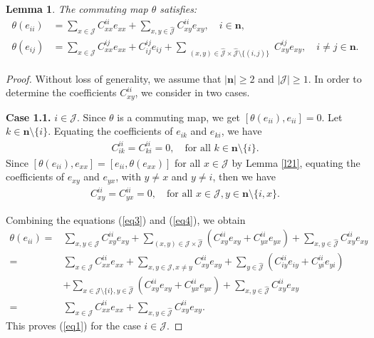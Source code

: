 \documentclass[10pt,a4paper]{amsart}
\newtheorem{lemma}{Lemma}
\begin{document}
\begin{lemma}\label{l22}
The commuting map $\theta$ satisfies:
 \begin{align}
 \theta(e_{ii}) &= \sum_{x \in \mathcal{J}} C_{xx}^{ii} e_{xx} + \sum_{x,y \in \hat{\mathcal{J}}} C_{xy}^{ii} e_{xy}, \quad i   \in \mathbf{n},  \label{eq1}\\
 \theta(e_{ij}) &= \sum_{x \in \mathcal{J}} C_{xx}^{ij} e_{xx} + C_{ij}^{ij} e_{ij} + 
 \sum_{\substack{(x,y) \in \hat{\mathcal{J}}\times \hat{\mathcal{J}}\setminus \{(i,j)\}}} C_{xy}^{ij} e_{xy}, \quad i \neq j \in \mathbf{n}.\label{eq2}
 \end{align}
\end{lemma}

\begin{proof}
Without loss of generality, we assume that $|\mathbf{n}| \geq 2$ and $|\mathcal{J}| \geq 1$. In order to determine the coefficients $C_{xy}^{ii}$, we consider in two cases.

\textbf{Case 1.1.} $i \in \mathcal{J}$.
 Since $\theta$ is a commuting map,  we get $[\theta(e_{ii}), e_{ii}] = 0$. Let $k \in \mathbf{n} \setminus \{i\}$. Equating the coefficients of $e_{ik}$ and $e_{ki}$, we have
  \begin{align}\label{eq3}
  C_{ik}^{ii} = C_{ki}^{ii} = 0, \quad \text{for all } k \in \mathbf{n} \setminus \{i\}.
  \end{align}
Since $[\theta(e_{ii}), e_{xx}] = [e_{ii}, \theta(e_{xx})]$ for all $x \in \mathcal{J}$ by Lemma \ref{l21}, equating the coefficients of $e_{xy}$ and $e_{yx}$, with $y \neq x$ and $y \neq i$, then we have
 \begin{align}\label{eq4}
 C_{xy}^{ii} = C_{yx}^{ii} = 0, \quad \text{for all } x \in \mathcal{J}, y \in \mathbf{n} \setminus \{i,x\}.
 \end{align}

Combining the equations (\ref{eq3}) and (\ref{eq4}), we obtain
 \begin{align*}
 \theta(e_{ii})=& \sum_{x,y \in \mathcal{J}} C_{xy}^{ii} e_{xy}
 +\sum_{(x,y) \in \mathcal{J} \times \hat{\mathcal{J}}} (C_{xy}^{ii} e_{xy}+C_{yx}^{ii} e_{yx})+\sum_{x,y \in \hat{\mathcal{J}}} C_{xy}^{ii} e_{xy}\\
=&\sum_{x \in \mathcal{J}} C_{xx}^{ii} e_{xx} + \sum_{x,y \in \mathcal{J}, x\neq y} C_{xy}^{ii} e_{xy}
 +\sum_{y\in \hat{\mathcal{J}}} (C_{iy}^{ii} e_{iy}+C_{yi}^{ii} e_{yi})\\
  &+\sum_{x \in \mathcal{J}\setminus \{i\}, y\in \hat{\mathcal{J}}} (C_{xy}^{ii} e_{xy}+C_{yx}^{ii} e_{yx})+\sum_{x,y \in \hat{\mathcal{J}}} C_{xy}^{ii} e_{xy}\\
=& \sum_{x \in \mathcal{J}} C_{xx}^{ii} e_{xx} + \sum_{x, y \in \hat{\mathcal{J}}} C_{xy}^{ii} e_{xy}.
 \end{align*}
This proves (\ref{eq1}) for the case $ i \in \mathcal{J} $.


\end{proof}
\end{document}
